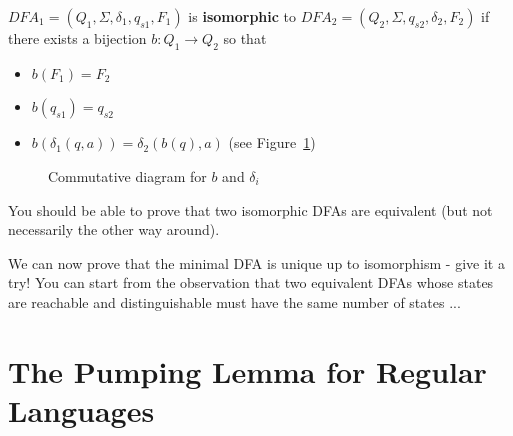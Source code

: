 \begin{definition}
$DFA_1 = (Q_1,\Sigma,\delta_1,q_{s1},F_1)$ is {\bf isomorphic} to
  $DFA_2 = (Q_2,\Sigma,q_{s2},\delta_2,F_2)$ if there exists a
  bijection
%
$b: Q_1 \rightarrow Q_2$ so that
\begin{itemize}
\item $b(F_1) = F_2$
\item $b(q_{s1}) = q_{s2}$
\item $b(\delta_1(q,a)) = \delta_2(b(q),a)$ (see Figure~\ref{diagram1})
\end{itemize}
\end{definition}

\begin{figure}[h]
\caption{Commutative diagram for $b$ and $\delta_i$\label{diagram1}}
\end{figure}


You should be able to prove that two isomorphic DFAs are equivalent
(but not necessarily the other way around).



We can now prove that the minimal DFA is unique up to isomorphism -
give it a try! You can start from the observation that two equivalent
DFAs whose states are reachable and distinguishable must have the same
number of states ...




\section{The Pumping Lemma for Regular Languages}


